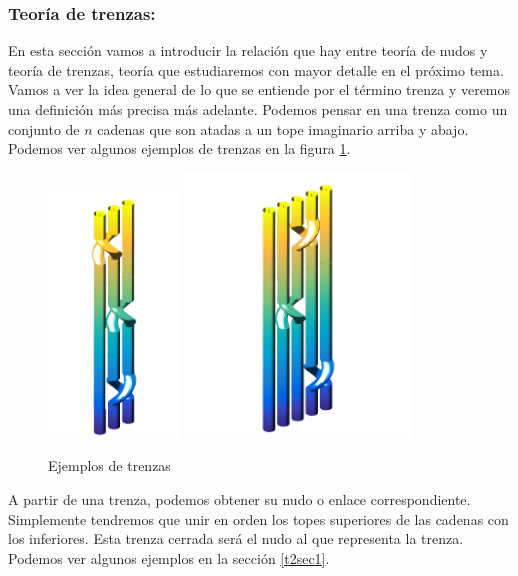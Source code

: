 \documentclass[14pt]{extarticle}
\begin{document}
\begin{center}
	\item \subsubsection{Teoría de trenzas:}
\end{center}
En esta sección vamos a introducir la relación que hay entre teoría de nudos y teoría de trenzas, teoría que estudiaremos con mayor detalle en el próximo tema.\\

Vamos a ver la idea general de lo que se entiende por el término trenza y veremos una definición más precisa más adelante. Podemos pensar en una trenza como un conjunto de $n$ cadenas que son atadas a un tope imaginario arriba y abajo. Podemos ver algunos ejemplos de trenzas en la figura \ref{ntren1}.\\
   \begin{figure}[h!]
   	\centering
   	\includegraphics[width=3.5cm]{itrenzas/t4.png}
   	\space
   	\includegraphics[width=6cm]{itrenzas/t7.png}
   	\caption{Ejemplos de trenzas}
   	\label{ntren1} 
   \end{figure} 

A partir de una trenza, podemos obtener su nudo o enlace correspondiente. Simplemente tendremos que unir en orden  los topes superiores de las cadenas con los inferiores. Esta trenza cerrada será el nudo al que representa la trenza. Podemos ver algunos ejemplos en la sección \ref{t2sec1}.\\
\end{document}
